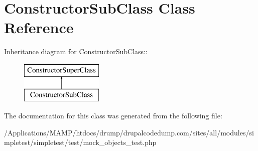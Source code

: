 \hypertarget{class_constructor_sub_class}{
\section{ConstructorSubClass Class Reference}
\label{class_constructor_sub_class}
}
Inheritance diagram for ConstructorSubClass::\begin{figure}[H]
\begin{center}
\leavevmode
\includegraphics[height=2cm]{class_constructor_sub_class}
\end{center}
\end{figure}


The documentation for this class was generated from the following file:\begin{DoxyCompactItemize}
\item 
/Applications/MAMP/htdocs/drump/drupalcodedump.com/sites/all/modules/simpletest/simpletest/test/mock\_\-objects\_\-test.php\end{DoxyCompactItemize}

